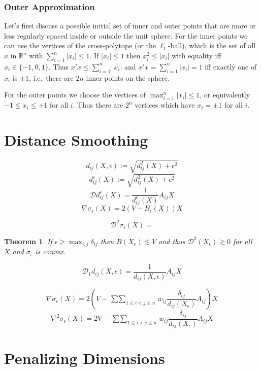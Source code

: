 \documentclass[
  12pt,
]{book}
\newtheorem{theorem}{Theorem}[chapter]
\theoremstyle{definition}
\theoremstyle{definition}
\theoremstyle{definition}
\theoremstyle{definition}
\theoremstyle{remark}
\begin{document}
\hypertarget{outer-approximation}{%
\subsubsection{Outer Approximation}\label{outer-approximation}}

Let's first discuss a possible initial set of inner and outer points that are more or less regularly spaced inside or outside the unit sphere. For the inner points we can use the vertices of the cross-polytope (or the \(\ell_1\)-ball), which is the set of all \(x\) in \(\mathbb{R}^n\) with \(\sum_{i=1}^n|x_i|\leq 1\). If \(|x_i|\leq 1\) then \(x_i^2\leq|x_i|\) with equality iff \(x_i\in\{-1,0,1\}\). Thus \(x'x\leq\sum_{i=1}^n|x_i|\) and \(x'x=\sum_{i=1}^n|x_i|=1\) iff exactly one of
\(x_i\) is \(\pm 1\), i.e.~there are \(2n\) inner points on the sphere.

For the outer points we choose the vertices of \(\max_{i=1}^n|x_i|\leq 1\), or equivalently \(-1\leq x_i\leq +1\) for all \(i\). Thus there are \(2^n\) vertices which have \(x_i=\pm 1\) for all \(i\).

\hypertarget{distance-smoothing}{%
\section{Distance Smoothing}\label{distance-smoothing}}

\[
d_{ij}(X,\epsilon):=\sqrt{d_{ij}^2(X)+\epsilon^2}
\]
\[
d_{ij}^\epsilon(X):=\sqrt{d_{ij}^2(X)+\epsilon^2}
\]
\[
\mathcal{D}d_{ij}^\epsilon(X)=\frac{1}{d_{ij}^\epsilon(X)}A_{ij}X
\]
\[
\nabla\sigma_\epsilon(X)=2(V-B_\epsilon(X))X
\]

\[
\mathcal{D}^2\sigma_\epsilon(X)=
\]
\begin{theorem}
\protect\hypertarget{thm:smoothsconvex}{}{\label{thm:smoothsconvex} }If \(\epsilon\geq\max_{i,j}\delta_{ij}\) then \(B(X_\epsilon)\lesssim V\) and thus \(\mathcal{D}^2(X_\epsilon)\gtrsim 0\) for all \(X\) and \(\sigma_\epsilon\) is convex.
\end{theorem}

\[
\mathcal{D}_1d_{ij}(X,\epsilon)=\frac{1}{d_{ij}(X,\epsilon)}A_{ij}X
\]

\[
\nabla\sigma_\epsilon(X)=2\left(V-\mathop{\sum\sum}_{1\leq i<j\leq n}w_{ij}\frac{\delta_{ij}}{d_{ij}(X_\epsilon)}A_{ij}\right)X
\]
\[
\nabla^2\sigma_\epsilon(X)=2V-\mathop{\sum\sum}_{1\leq i<j\leq n}w_{ij}\frac{\delta_{ij}}{d_{ij}(X_\epsilon)}A_{ij}X
\]

\hypertarget{penalizing-dimensions}{%
\section{Penalizing Dimensions}\label{penalizing-dimensions}}
\end{document}
